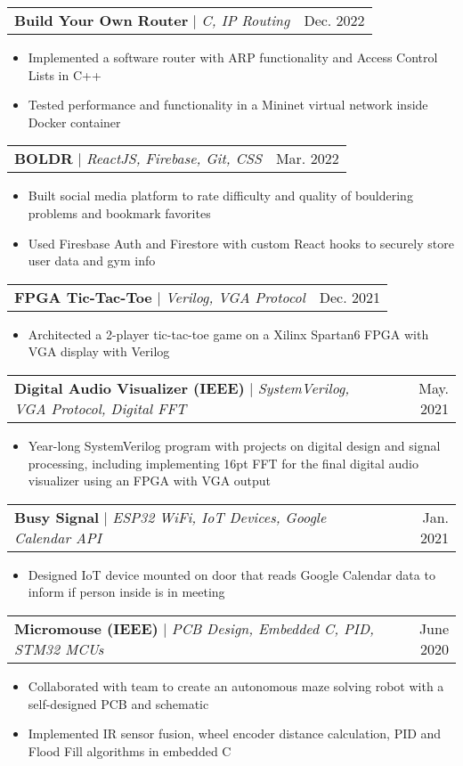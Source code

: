 \documentclass[letterpaper,11pt]{article}
\makeatletter
\newcommand{\resumeItem}[1]{
  \item\small{
    {#1 \vspace{-2pt}}
  }
}
\newcommand{\resumeProjectHeading}[2]{
  \item
  \begin{tabular*}{0.97\textwidth}{l@{\extracolsep{\fill}}r}
    \small#1 & #2 \\
  \end{tabular*}\vspace{-7pt}
}
\newcommand{\resumeItemListStart}{\begin{itemize}}
\newcommand{\resumeItemListEnd}{\end{itemize}\vspace{-5pt}}
\makeatother
\begin{document}
    \resumeProjectHeading
      {\textbf{Build Your Own Router} $|$ \emph{C, IP Routing}}{Dec. 2022}
      \resumeItemListStart
        \resumeItem{
          Implemented a software router with ARP functionality and Access
          Control Lists in C++
        }
        \resumeItem{
          Tested performance and functionality in a Mininet virtual network inside
          Docker container
        }
      \resumeItemListEnd

    \resumeProjectHeading
    {\textbf{BOLDR} $|$ \emph{ReactJS, Firebase, Git, CSS}}{Mar. 2022}
    \resumeItemListStart
      \resumeItem{
        Built social media platform to rate difficulty and quality of 
        bouldering problems and bookmark favorites 
      }
      \resumeItem{
        Used Firesbase Auth and Firestore with custom React hooks 
        to securely store user data and gym info
      }
    \resumeItemListEnd

    \resumeProjectHeading
      {\textbf{FPGA Tic-Tac-Toe} $|$ \emph{Verilog, VGA Protocol}}{Dec. 2021}
      \resumeItemListStart
        \resumeItem{
          Architected a 2-player tic-tac-toe game on a Xilinx Spartan6 FPGA with
          VGA display with Verilog 
        }
      \resumeItemListEnd

    \resumeProjectHeading
      {\textbf{Digital Audio Visualizer (IEEE)} $|$ \emph{SystemVerilog, VGA Protocol, Digital FFT}}{May. 2021}
      \resumeItemListStart
        \resumeItem{
          Year-long SystemVerilog program with projects on digital design and 
          signal processing, including implementing 16pt FFT for the final 
          digital audio visualizer using an FPGA with VGA output
        }
      \resumeItemListEnd

    \resumeProjectHeading
      {\textbf{Busy Signal} $|$ \emph{ESP32 WiFi, IoT Devices, Google Calendar API}}{Jan. 2021}
      \resumeItemListStart
        \resumeItem{
          Designed IoT device mounted on door that reads Google Calendar data to inform
          if person inside is in meeting
        }
      \resumeItemListEnd

    \resumeProjectHeading
      {\textbf{Micromouse (IEEE)} $|$ \emph{PCB Design, Embedded C, PID, STM32 MCUs}}{June 2020}
      \resumeItemListStart
        \resumeItem{ 
          Collaborated with team to create an autonomous maze solving robot
          with a self-designed PCB and schematic
        }
        \resumeItem{
          Implemented IR sensor fusion, wheel encoder distance calculation, PID
          and Flood Fill algorithms in embedded C
        }
      \resumeItemListEnd
\end{document}
